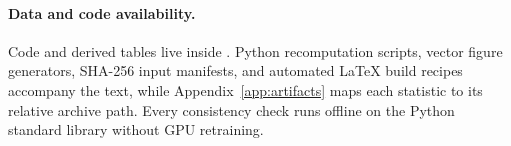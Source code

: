\paragraph{Data and code availability.}
Code and derived tables live inside 
\cite{artifacts2026}. Python recomputation scripts, vector figure
generators, SHA-256 input manifests, and automated LaTeX build recipes
accompany the text, while Appendix~\ref{app:artifacts} maps each statistic
to its relative archive path. Every consistency check runs offline on the
Python standard library without GPU retraining.
